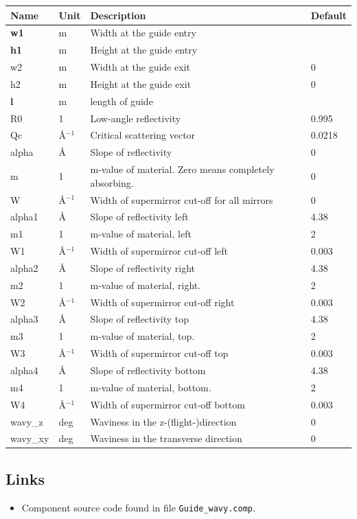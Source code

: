 \begin{longtable}{p{}p{}p{}p{}}
\toprule
\textbf{Name} & \textbf{Unit} & \textbf{Description} & \textbf{Default} \\
\midrule
\endhead
\textbf{w1} & m & Width at the guide entry &  \\
\textbf{h1} & m & Height at the guide entry &  \\
w2 & m & Width at the guide exit & 0 \\
h2 & m & Height at the guide exit & 0 \\
\textbf{l} & m & length of guide &  \\
R0 & 1 & Low-angle reflectivity & 0.995 \\
Qc & \AA{}$^{-1}$ & Critical scattering vector & 0.0218 \\
alpha & \AA{} & Slope of reflectivity & 0 \\
m & 1 & m-value of material. Zero means completely absorbing. & 0 \\
W & \AA{}$^{-1}$ & Width of supermirror cut-off for all mirrors & 0 \\
alpha1 & \AA{} & Slope of reflectivity left & 4.38 \\
m1 & 1 & m-value of material, left & 2 \\
W1 & \AA{}$^{-1}$ & Width of supermirror cut-off left & 0.003 \\
alpha2 & \AA{} & Slope of reflectivity right & 4.38 \\
m2 & 1 & m-value of material, right. & 2 \\
W2 & \AA{}$^{-1}$ & Width of supermirror cut-off right & 0.003 \\
alpha3 & \AA{} & Slope of reflectivity top & 4.38 \\
m3 & 1 & m-value of material, top. & 2 \\
W3 & \AA{}$^{-1}$ & Width of supermirror cut-off top & 0.003 \\
alpha4 & \AA{} & Slope of reflectivity bottom & 4.38 \\
m4 & 1 & m-value of material, bottom. & 2 \\
W4 & \AA{}$^{-1}$ & Width of supermirror cut-off bottom & 0.003 \\
wavy\_z & deg & Waviness in the z-(flight-)direction & 0 \\
wavy\_xy & deg & Waviness in the transverse direction & 0 \\
\bottomrule
\end{longtable}

\subsection*{Links}
\begin{itemize}
  \item Component source code found in file \texttt{Guide\_wavy.comp}.
\end{itemize}
